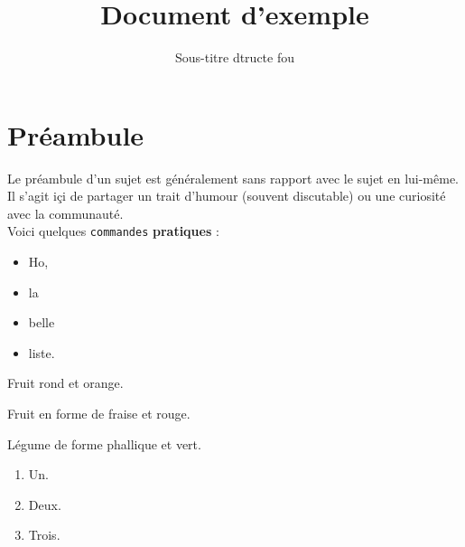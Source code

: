 \documentclass{42}
\begin{document}
                           \title{Document d'exemple}
                          \subtitle{Sous-titre dtructe fou}


\maketitle

\tableofcontents


\chapter{Préambule}

    Le pr\'eambule d'un sujet est g\'en\'eralement sans rapport avec
    le sujet en lui-m\^eme. Il s'agit i\c ci de partager un trait
    d'humour (souvent discutable) ou une curiosit\'e avec la
    communaut\'e.\\

    Voici quelques \texttt{commandes} \textbf{pratiques} :\\

    \begin{itemize}\itemsep1pt
        \item Ho,
        \item la
        \item belle
        \item liste.
    \end{itemize}

    \begin{description}\itemsep3pt
        \item [Orange :] Fruit rond et orange.
        \item [Fraise :] Fruit en forme de fraise et rouge.
        \item [Comcombre :] L\'egume de forme phallique et vert.
    \end{description}

    \begin{enumerate}\itemsep7pt
        \item Un.
        \item Deux.
        \item Trois.
    \end{enumerate}
\end{document}
